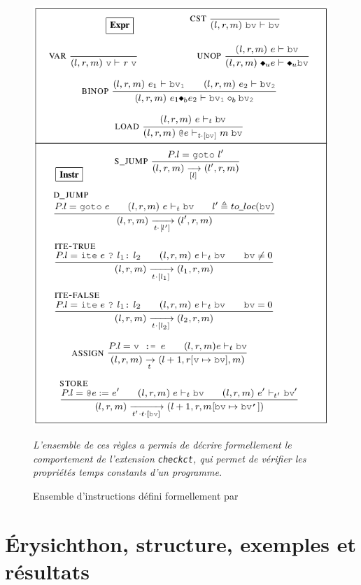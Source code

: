 \begin{figure}[!htb]
  \centering
  \begin{minipage}[b]{0.55\textwidth}
    \centering
    \includegraphics[scale=0.39]{pictures/instructions_formelles.png}
    \caption{Ensemble d'instructions défini formellement par \cite{binsecRel2019}}
    \label{fig:ensemble_instr_formelles}
  \end{minipage}\hfill
  \begin{minipage}[b]{0.4\textwidth}
    \textit{L'ensemble de ces règles a permis de décrire formellement le comportement
    de l'extension \texttt{checkct}, qui permet de vérifier les propriétés
    temps constants d'un programme.}
  \end{minipage}
\end{figure}


\chapter{Érysichthon, structure, exemples et résultats}


